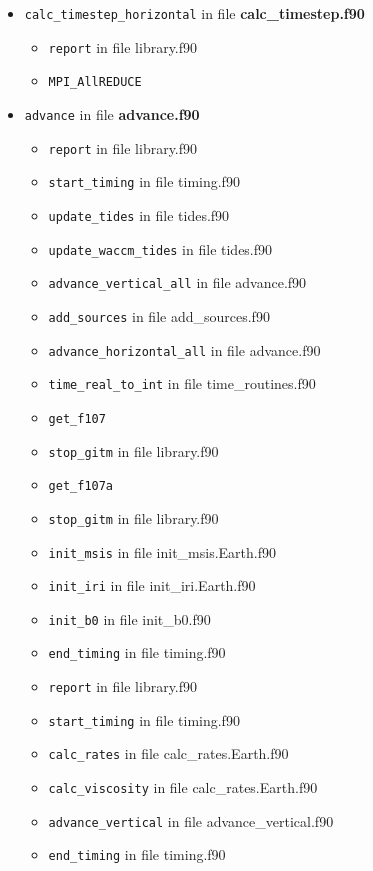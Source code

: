\begin{itemize}
\begin{itemize}
  \item {\tt calc\_timestep\_horizontal}   in file {\bf calc\_timestep.f90}
    \begin{itemize}
      \item {\tt report} in file library.f90
      \item {\tt MPI\_AllREDUCE}
    \end{itemize}


  \item {\tt advance}   in file {\bf advance.f90}
    \begin{itemize}
      \item {\tt report} in file library.f90
      \item {\tt start\_timing} in file timing.f90
      \item {\tt update\_tides} in file tides.f90
      \item {\tt update\_waccm\_tides} in file tides.f90
      \item {\tt advance\_vertical\_all} in file advance.f90
      \item {\tt add\_sources} in file add\_sources.f90
      \item {\tt advance\_horizontal\_all} in file advance.f90
      \item {\tt time\_real\_to\_int} in file time\_routines.f90
      \item {\tt get\_f107}
      \item {\tt stop\_gitm} in file library.f90
      \item {\tt get\_f107a}
      \item {\tt stop\_gitm} in file library.f90
      \item {\tt init\_msis} in file init\_msis.Earth.f90
      \item {\tt init\_iri} in file init\_iri.Earth.f90
      \item {\tt init\_b0} in file init\_b0.f90
      \item {\tt end\_timing} in file timing.f90
      \item {\tt report} in file library.f90
      \item {\tt start\_timing} in file timing.f90
      \item {\tt calc\_rates} in file calc\_rates.Earth.f90
      \item {\tt calc\_viscosity} in file calc\_rates.Earth.f90
      \item {\tt advance\_vertical} in file advance\_vertical.f90
      \item {\tt end\_timing} in file timing.f90

\end{itemize}
\end{itemize}
\end{itemize}
